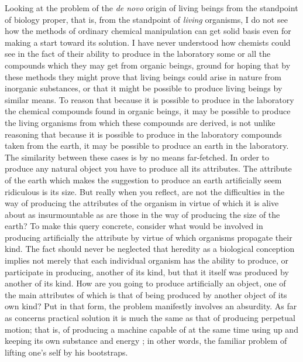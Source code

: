 \documentclass[a4paper, 11pt, oneside, polutonikogreek, english, landscape]{article}
\begin{document}
Looking at the problem of the \emph{de novo} origin of living beings from the standpoint of biology proper, that is, from the standpoint of \emph{living} organisms, I do not see how the methods of ordinary chemical manipulation can get solid basis even for making a start toward its solution. I have never understood how chemists could see in the fact of their ability to produce in the laboratory some or all the compounds which they may get from organic beings, ground for hoping that by these methods they might prove that living beings could arise in nature from inorganic substances, or that it might be possible to produce living beings by similar means. To reason that because it is possible to produce in the laboratory the chemical compounds found in organic beings, it may be possible to produce the living organisms from which these compounds are derived, is not unlike reasoning that because it is possible to produce in the laboratory compounds taken from the earth, it may be possible to produce an earth in the laboratory. The similarity between these cases is by no means far-fetched. In order to produce any natural object you have to produce all its attributes. The attribute of the earth which makes the suggestion to produce an earth artificially seem ridiculous is its size. But really when you reflect, are not the difficulties in the way of producing the attributes of the organism in virtue of which it is alive about as insurmountable as are those in the way of producing the size of the earth? To make this query concrete, consider what would be involved in producing artificially the attribute by virtue of which organisms propagate their kind. The fact should never be neglected that heredity as a biological conception implies not merely that each individual organism has the ability to produce, or participate in producing, another of its kind, but that it itself was produced by another of its kind. How are you going to produce artificially an object, one of the main attributes of which is that of being produced by another object of its own kind? Put in that form, the problem manifestly involves an absurdity. As far as concerns practical solution it is much the same as that of producing perpetual motion; that is, of producing a machine capable of at the same time using up and keeping its own substance and energy ; in other words, the familiar problem of lifting one's self by his bootstraps.
\end{document}
